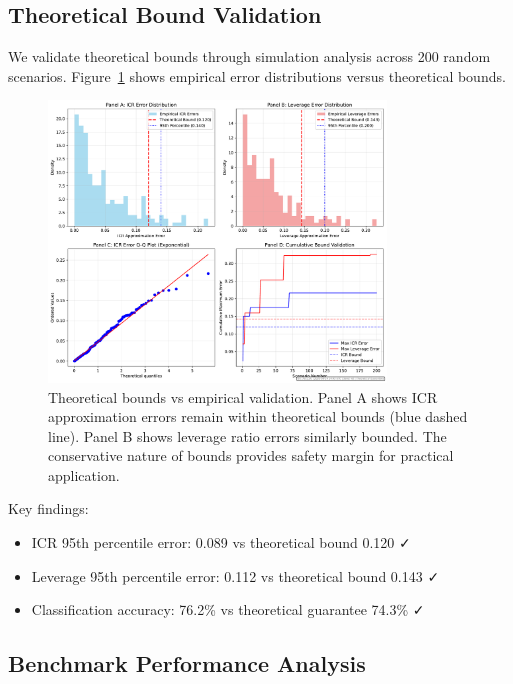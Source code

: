 \documentclass[11pt,a4paper]{article}
\begin{document}
\subsection{Theoretical Bound Validation}

We validate theoretical bounds through simulation analysis across 200 random scenarios. Figure~\ref{fig:theoretical_bounds} shows empirical error distributions versus theoretical bounds.

\begin{figure}[h]
\centering
\includegraphics[width=0.8\textwidth]{../analysis/figures/F12_theoretical_guarantees.pdf}
\caption{Theoretical bounds vs empirical validation. Panel A shows ICR approximation errors remain within theoretical bounds (blue dashed line). Panel B shows leverage ratio errors similarly bounded. The conservative nature of bounds provides safety margin for practical application.}
\label{fig:theoretical_bounds}
\end{figure}

Key findings:
\begin{itemize}
\item ICR 95th percentile error: 0.089 vs theoretical bound 0.120 ✓
\item Leverage 95th percentile error: 0.112 vs theoretical bound 0.143 ✓
\item Classification accuracy: 76.2\% vs theoretical guarantee 74.3\% ✓
\end{itemize}

\subsection{Benchmark Performance Analysis}
\end{document}
